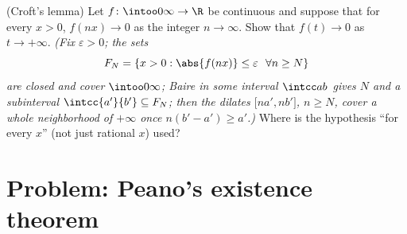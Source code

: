 \begin{exercise}[$\star\star\star$]\label{exo:b3:complete:12}
(Croft's lemma) Let $f\colon\intoo0\infty\to\R$ be continuous
and suppose that for every $x > 0$, $f(nx) \to 0$ as the
integer $n \to \infty$. Show that $f(t) \to 0$ as $t \to
+\infty$. \emph{(Fix $\varepsilon > 0$; the sets
\[
F_N = \{x > 0 : \abs{f(nx)} \leq \varepsilon\ \ \forall n
\geq N\}
\]
are closed and cover $\intoo0\infty$; Baire in some interval
$\intcc ab$ gives $N$ and a subinterval $\intcc{a'}{b'}
\subseteq F_N$; then the dilates $\bigl[na', nb'\bigr]$, $n
\geq N$, cover a whole neighborhood of $+\infty$ once
$n(b' - a') \geq a'$.)} Where is the hypothesis ``for every
$x$'' (not just rational $x$) used?
\end{exercise}

\section{Problem: Peano's existence theorem}

